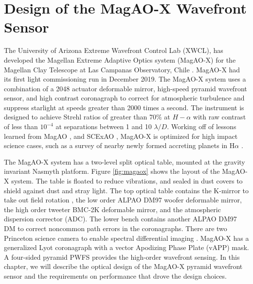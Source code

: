 \chapter{Design of the MagAO-X Wavefront Sensor}\label{CH5}

The University of Arizona Extreme Wavefront Control Lab (XWCL), has developed the Magellan Extreme Adaptive Optics system (MagAO-X) for the Magellan Clay Telescope at Las Campanas Observatory, Chile \citep{males2020magao}. MagAO-X had its first light commissioning run in December 2019. The MagAO-X system uses a combination of a 2048 actuator deformable mirror, high-speed pyramid wavefront sensor, and high contrast coronagraph to correct for atmospheric turbulence and suppress starlight at speeds greater than 2000 times a second. The instrument is designed to achieve Strehl ratios of greater than 70$\%$ at $H-\alpha$ with raw contrast of less than $10^{-4}$ at separations between 1 and 10 $\lambda/D$.\citep{males2018magao} Working off of lessons learned from MagAO \citep{close2018status}, and SCExAO \citep{jovanovic2015subaru}, MagAO-X is optimized for high impact science cases, such as a survey of nearby newly formed accreting planets in H$\alpha$ \citep{males2020magao}.

The MagAO-X system has a two-level split optical table, mounted at the gravity invariant Nasmyth platform. Figure \ref{fig:magaox} shows the layout of the MagAO-X system. The table is floated to reduce vibrations, and sealed in dust covers to shield against dust and stray light. The top optical table contains the K-mirror to take out field rotation \citep{hedglen2018optical}, the low order ALPAO DM97 woofer deformable mirror, the high order tweeter BMC-2K deformable mirror, and the atmospheric dispersion corrector (ADC). The lower bench contains another ALPAO DM97 DM to correct noncommon path errors in the coronagraphs. There are two Princeton science camera to enable spectral differential imaging \citep{biller_sdi}. MagAO-X has a generalized Lyot coronagraph with a vector Apodizing Phase Plate (vAPP) mask. A four-sided pyramid PWFS provides the high-order wavefront sensing.  In this chapter, we will describe the optical design of the MagAO-X pyramid wavefront sensor and the requirements on performance that drove the design choices.

